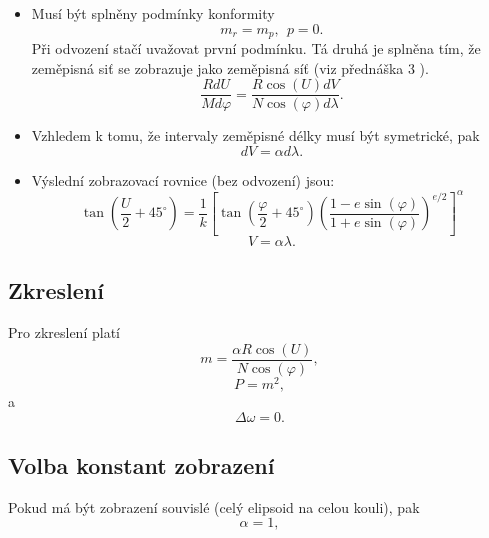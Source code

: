 \begin{itemize}
\item Musí být splněny podmínky konformity
\begin{equation}
m_{r} = m_{p},\ \ p = 0.
\end{equation}
Při odvození stačí uvažovat první podmínku. Tá druhá je splněna tím, že zeměpisná siť se zobrazuje jako zeměpisná síť (viz přednáška 3 \cite{Cajthaml2014}).
\begin{equation}
\dfrac{R dU}{Md\varphi} = \dfrac{R\cos{\left(U\right)}dV}{N\cos{\left(\varphi\right)}d\lambda}.
\end{equation}
\item Vzhledem k tomu, že intervaly zeměpisné délky musí být symetrické, pak
\begin{equation}
dV = \alpha d\lambda.
\end{equation}
\item Výslední zobrazovací rovnice (bez odvození) jsou:
\begin{equation}
\tan{\left(\dfrac{U}{2}+45^{\circ}\right)} = \dfrac{1}{k}\left[\tan{\left(\dfrac{\varphi}{2}+45^{\circ}\right)}  \left(\dfrac{1-e\sin{\left(\varphi\right)}}{1+e\sin{\left(\varphi\right)}} \right)^{e/2}  \right]^{\alpha}
\end{equation}
\begin{equation}
V = \alpha\lambda.
\end{equation}
\end{itemize}
\subsection*{Zkreslení}
Pro zkreslení platí
\begin{equation}
m = \dfrac{\alpha R \cos{\left(U\right)}}{N\cos{\left(\varphi\right)}},
\end{equation}
\begin{equation}
P = m^{2},
\end{equation}
a
\begin{equation}
\Delta\omega = 0.
\end{equation}

\subsection*{Volba konstant zobrazení}

Pokud má být zobrazení souvislé (celý elipsoid na celou kouli), pak
\begin{equation}
\alpha = 1,
\end{equation}


